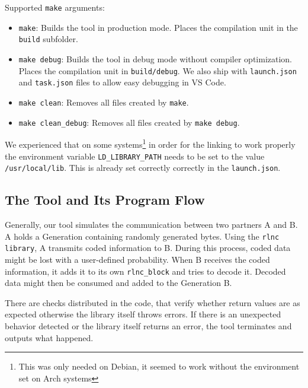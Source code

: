 \documentclass[a4paper,english,10pt]{tumarticle}
\begin{document}
Supported \texttt{make} arguments:
\begin{itemize}
  \item \texttt{make}: Builds the tool in production mode. Places the compilation unit in the
  \texttt{build} subfolder.
  \item \texttt{make debug}: Builds the tool in debug mode without compiler optimization. Places the
  compilation unit in \texttt{build/debug}. We also ship with \texttt{launch.json} and
  \texttt{task.json} files to allow easy debugging in VS Code.
  \item \texttt{make clean}: Removes all files created by \texttt{make}.
  \item \texttt{make clean\_debug}: Removes all files created by \texttt{make debug}.
\end{itemize}

We experienced that on some systems\footnote{This was only needed on Debian, it seemed to work
without the environment set on Arch systems} in order for the linking to work properly the
environment variable \texttt{LD\_LIBRARY\_PATH} needs to be set to the value
\texttt{/usr/local/lib}. This is already set correctly correctly in the \texttt{launch.json}.


\subsection{The Tool and Its Program Flow}\label{sec:tool}
Generally, our tool simulates the
communication between two partners A and B. A holds a Generation containing randomly generated
bytes. Using the \texttt{rlnc library}, A transmits coded information to B. During this process,
coded data might be lost with a user-defined probability. When B receives the coded information, it
adds it to its own \texttt{rlnc\_block} and tries to decode it. Decoded data might then be consumed
and added to the Generation B.

There are checks distributed in the code, that verify whether return values are as expected
otherwise the library itself throws errors. If there is an unexpected behavior detected or the
library itself returns an error, the tool terminates and outputs what happened.
\end{document}
